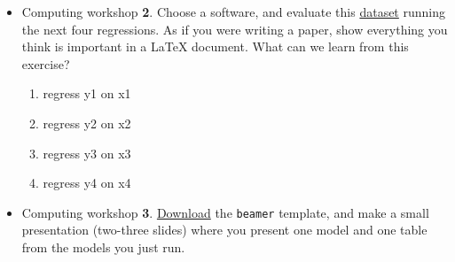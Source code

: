 \documentclass[10pt]{article}
\begin{document}
\begin{enumerate}
\begin{itemize}
\begin{itemize}
				\item Computing workshop {\bf 2}. Choose a software, and evaluate this \href{http://gofile.me/2nH49/gfMiTUvm}{dataset} running the next four regressions. As if you were writing a paper, show everything you think is important in a \LaTeX\; document. What can we learn from this exercise?
					\begin{enumerate}
					\item regress y1 on x1
					\item regress y2 on x2
					\item regress y3 on x3
					\item regress y4 on x4
					\end{enumerate}
				\item Computing workshop {\bf 3}. \href{http://gofile.me/2nH49/BzJ4OrCd}{Download} the \texttt{beamer} template, and make a small presentation (two-three slides) where you present one model and one table from the models you just run.
				\end{itemize}
		\end{itemize}
\end{enumerate}



%
%
\end{document}
